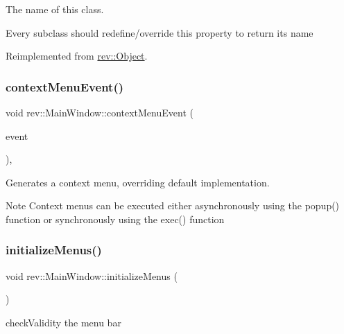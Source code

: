 The name of this class. 

Every subclass should redefine/override this property to return its name 

Reimplemented from \mbox{\hyperlink{classrev_1_1_object_a7a2013f91169479b65cf93afdc5d9a68}{rev\+::\+Object}}.

\mbox{\label{classrev_1_1_main_window_a122fc9956c6d65e28bb9140343b02655}} 
\subsubsection{\texorpdfstring{contextMenuEvent()}{contextMenuEvent()}}
{\footnotesize\ttfamily void rev\+::\+Main\+Window\+::context\+Menu\+Event (\begin{DoxyParamCaption}\item[{Q\+Context\+Menu\+Event $\ast$}]{event }\end{DoxyParamCaption})\hspace{0.3cm}{\ttfamily [override]}, {\ttfamily [protected]}}



Generates a context menu, overriding default implementation. 

\begin{DoxyNote}{Note}
Context menus can be executed either asynchronously using the popup() function or synchronously using the exec() function 
\end{DoxyNote}
\mbox{\label{classrev_1_1_main_window_a164619747b7c7a10d63a628154a6eeb5}} 
\subsubsection{\texorpdfstring{initializeMenus()}{initializeMenus()}}
{\footnotesize\ttfamily void rev\+::\+Main\+Window\+::initialize\+Menus (\begin{DoxyParamCaption}{ }\end{DoxyParamCaption})\hspace{0.3cm}{\ttfamily [protected]}}



check\+Validity the menu bar 

